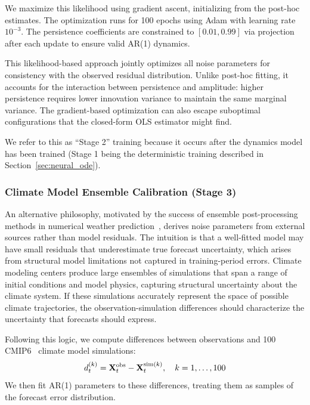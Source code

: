 We maximize this likelihood using gradient ascent, initializing from the post-hoc estimates. The optimization runs for 100 epochs using Adam with learning rate $10^{-3}$. The persistence coefficients are constrained to $[0.01, 0.99]$ via projection after each update to ensure valid AR(1) dynamics.

This likelihood-based approach jointly optimizes all noise parameters for consistency with the observed residual distribution. Unlike post-hoc fitting, it accounts for the interaction between persistence and amplitude: higher persistence requires lower innovation variance to maintain the same marginal variance. The gradient-based optimization can also escape suboptimal configurations that the closed-form OLS estimator might find.

We refer to this as ``Stage 2'' training because it occurs after the dynamics model has been trained (Stage 1 being the deterministic training described in Section~\ref{sec:neural_ode}).

\subsubsection{Climate Model Ensemble Calibration (Stage 3)}

An alternative philosophy, motivated by the success of ensemble post-processing methods in numerical weather prediction~\cite{rasp2018neural,vannitsem2021statistical}, derives noise parameters from external sources rather than model residuals. The intuition is that a well-fitted model may have small residuals that underestimate true forecast uncertainty, which arises from structural model limitations not captured in training-period errors. Climate modeling centers produce large ensembles of simulations that span a range of initial conditions and model physics, capturing structural uncertainty about the climate system. If these simulations accurately represent the space of possible climate trajectories, the observation-simulation differences should characterize the uncertainty that forecasts should express.

Following this logic, we compute differences between observations and 100 CMIP6~\cite{eyring2016cmip6} climate model simulations:
\begin{equation}
    d_t^{(k)} = \mathbf{X}_t^{\text{obs}} - \mathbf{X}_t^{\text{sim}(k)}, \quad k = 1, \ldots, 100
\end{equation}
We then fit AR(1) parameters to these differences, treating them as samples of the forecast error distribution.

